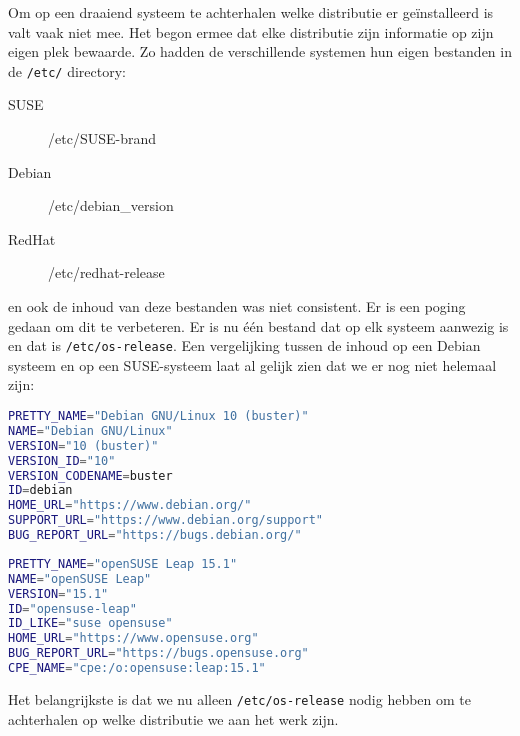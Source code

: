 Om op een draaiend systeem te achterhalen welke distributie er ge\"installeerd is valt vaak niet mee. Het begon ermee dat elke distributie zijn informatie op zijn eigen plek bewaarde. Zo hadden de verschillende systemen hun eigen bestanden in de \texttt{/etc/} directory:
\begin{description}
\item[SUSE] /etc/SUSE-brand
\item[Debian] /etc/debian\_version
\item[RedHat] /etc/redhat-release
\end{description}
en ook de inhoud van deze bestanden was niet consistent. Er is een poging gedaan om dit te verbeteren. Er is nu \'e\'en bestand dat op elk systeem aanwezig is en dat is \texttt{/etc/os-release}. Een vergelijking tussen de inhoud op een Debian systeem en op een SUSE-systeem laat al gelijk zien dat we er nog niet helemaal zijn:
\begin{lstlisting}[language=bash]
PRETTY_NAME="Debian GNU/Linux 10 (buster)"
NAME="Debian GNU/Linux"
VERSION="10 (buster)"
VERSION_ID="10"
VERSION_CODENAME=buster
ID=debian
HOME_URL="https://www.debian.org/"
SUPPORT_URL="https://www.debian.org/support"
BUG_REPORT_URL="https://bugs.debian.org/"
\end{lstlisting}

\begin{lstlisting}[language=bash]
PRETTY_NAME="openSUSE Leap 15.1"
NAME="openSUSE Leap"
VERSION="15.1"
ID="opensuse-leap"
ID_LIKE="suse opensuse"
HOME_URL="https://www.opensuse.org"
BUG_REPORT_URL="https://bugs.opensuse.org"
CPE_NAME="cpe:/o:opensuse:leap:15.1"
\end{lstlisting}

Het belangrijkste is dat we nu alleen \texttt{/etc/os-release} nodig hebben om te achterhalen op welke distributie we aan het werk zijn.

